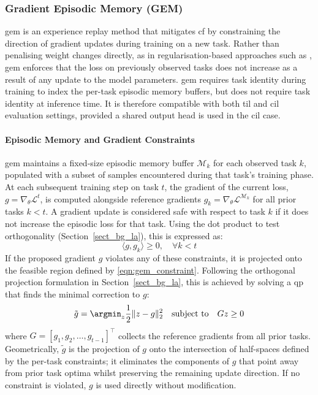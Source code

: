 \subsubsection{Gradient Episodic Memory (GEM)}

\gls{gem} \cite{ll_gem_2017} is an experience replay method that mitigates \gls{cf}
by constraining the direction of gradient updates during training on a new task.
Rather than penalising weight changes directly, as in regularisation-based
approaches such as \cite{ll_ewc_2017}, \gls{gem} enforces that the loss on
previously observed tasks does not increase as a result of any update to the
model parameters. \gls{gem} requires task identity during training to index the
per-task episodic memory buffers, but does not require task identity at
inference time. It is therefore compatible with both \gls{til} and \gls{cil}
evaluation settings, provided a shared output head is used in the \gls{cil}
case.


\paragraph{Episodic Memory and Gradient Constraints}

\gls{gem} maintains a fixed-size episodic memory buffer $\mathcal{M}_k$ for
each observed task $k$, populated with a subset of samples encountered during
that task's training phase. At each subsequent training step on task $t$, the
gradient of the current loss, $g = \nabla_\theta \mathcal{L}^t$, is computed
alongside reference gradients $g_k = \nabla_\theta \mathcal{L}^{\mathcal{M}_k}$
for all prior tasks $k < t$. A gradient update is considered safe with respect
to task $k$ if it does not increase the episodic loss for that task. Using the
dot product to test orthogonality (Section~\ref{sect_bg_la}), this is expressed
as:
%
\begin{equation}\label{eqn:gem_constraint}
    \langle g, g_k \rangle \geq 0, \quad \forall k < t
\end{equation}
%
If the proposed gradient $g$ violates any of these constraints, it is projected
onto the feasible region defined by \eqref{eqn:gem_constraint}. Following the
orthogonal projection formulation in Section~\ref{sect_bg_la}, this is achieved
by solving a \gls{qp} that finds the minimal correction to $g$:
%
\begin{equation}\label{eqn:gem_qp}
    \tilde{g} = \argmin_{z} \frac{1}{2}\|z - g\|^2_2
    \quad \text{subject to} \quad Gz \geq 0
\end{equation}
%
where $G = [g_1, g_2, \ldots, g_{t-1}]^\top$ collects the reference gradients
from all prior tasks. Geometrically, $\tilde{g}$ is the projection of $g$ onto
the intersection of half-spaces defined by the per-task constraints; it
eliminates the components of $g$ that point away from prior task optima whilst
preserving the remaining update direction. If no constraint is violated, $g$ is
used directly without modification.

